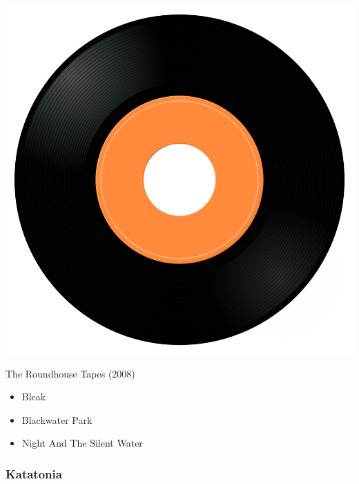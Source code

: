 \begin{minipage}[t]{0.25\textwidth}
\captionsetup{type=figure}
\includegraphics[width=\textwidth]{Images/cover.png}
\caption*{The Roundhouse Tapes (2008)}
\end{minipage}
\begin{minipage}[t]{0.25\textwidth}\vspace{0pt}
\begin{itemize}[nosep,leftmargin=1em,labelwidth=*,align=left]
	\setlength{\itemsep}{0pt}
	\item Bleak
	\item Blackwater Park
	\item Night And The Silent Water
\end{itemize}
\end{minipage}

\subsubsection{Katatonia}

